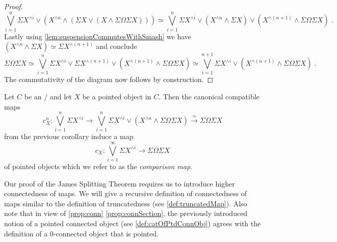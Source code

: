 \begin{corollary}
\begin{proof}
        \begin{equation*}
            \bigvee\limits_{i=1}^n\Sigma X^{\wedge i}\vee\left(X^{\wedge n}\wedge\left(\Sigma X\vee\left(X\wedge\Sigma\Omega\Sigma X\right)\right)\right)\simeq\bigvee\limits_{i=1}^n\Sigma X^{\wedge i}\vee\left(X^{\wedge n}\wedge\Sigma X\right)\vee\left(X^{\wedge (n+1)}\wedge\Sigma\Omega\Sigma X\right)\;.
        \end{equation*}
        Lastly using \cref{lem:suspensionCommutesWithSmash} we have $\left(X^{\wedge n}\wedge\Sigma X\right)\simeq \Sigma X^{\wedge (n+1)}$ and conclude
        \begin{equation*}
            \Sigma\Omega\Sigma X\simeq\bigvee\limits_{i=1}^n\Sigma X^{\wedge i}\vee\Sigma X^{\wedge (n+1)} \vee\left(X^{\wedge (n+1)}\wedge\Sigma\Omega\Sigma X\right)\simeq\bigvee\limits_{i=1}^{n+1}\Sigma X^{\wedge i}\vee\left(X^{\wedge (n+1)}\wedge\Sigma\Omega\Sigma X\right)\;.
        \end{equation*}
        The commutativity of the diagram now follows by construction.
    \end{proof}
\end{corollary}
\begin{definition}\label{def:jamesSplittingMap}
    Let $C$ be an \inftytop/ and let $X$ be a pointed object in $C$. 
    Then the canonical compatible maps 
    \begin{equation*}
        c_X^n\colon\bigvee\limits_{i=1}^n\Sigma X^{\wedge i}\to\bigvee\limits_{i=1}^n\Sigma X^{\wedge i}\vee\left(X^{\wedge n}\wedge\Sigma\Omega\Sigma X\right)\xrightarrow{\simeq}\Sigma\Omega\Sigma X
    \end{equation*}
    from the previous corollary induce a map
    \begin{equation*}
        c_X\colon\bigvee\limits_{i=1}^{\infty}\Sigma X^{\wedge i}\to\Sigma\Omega\Sigma X
    \end{equation*}
    of pointed objects which we refer to as the \emph{comparison map}.
\end{definition}
Our proof of the James Splitting Theorem requires us to introduce higher connectedness of maps. 
We will give a recursive definition of connectedness of maps similar to the definition of truncatedness (see \cref{def:truncatedMap}).
Also note that in view of \cref{prop:conn} \ref{prop:connSection}, the previously introduced notion of a pointed connected object (see \cref{def:catOfPtdConnObj}) agrees with the definition of a $0$-connected object that is pointed.
